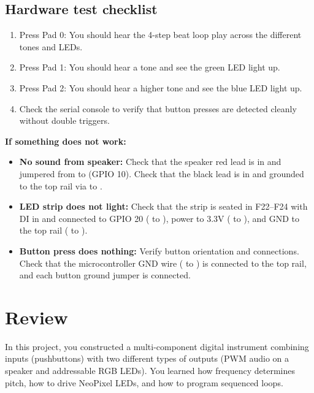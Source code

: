 \subsection{Hardware test checklist}
\begin{enumerate}
    \item Press Pad 0: You should hear the 4-step beat loop play across the different tones and LEDs.
    \item Press Pad 1: You should hear a tone and see the green LED light up.
    \item Press Pad 2: You should hear a higher tone and see the blue LED light up.
    \item Check the serial console to verify that button presses are detected cleanly without double triggers.
\end{enumerate}

\begin{tcolorbox}[colback=yellow!10!white,colframe=yellow!50!black]
    \textbf{If something does not work:}
    \begin{itemize}
        \item \textbf{No sound from speaker:} Check that the speaker red lead is in  and jumpered from  to  (GPIO 10). Check that the black lead is in  and grounded to the top rail via  to .
        \item \textbf{LED strip does not light:} Check that the strip is seated in F22--F24 with DI in  and connected to GPIO 20 ( to ), power to 3.3V ( to ), and GND to the top rail ( to ).
        \item \textbf{Button press does nothing:} Verify button orientation and connections. Check that the microcontroller GND wire ( to ) is connected to the top rail, and each button ground jumper is connected.
    \end{itemize}
\end{tcolorbox}

\section{Review}
In this project, you constructed a multi-component digital instrument combining inputs (pushbuttons) with two different types of outputs (PWM audio on a speaker and addressable RGB LEDs). You learned how frequency determines pitch, how to drive NeoPixel LEDs, and how to program sequenced loops.

